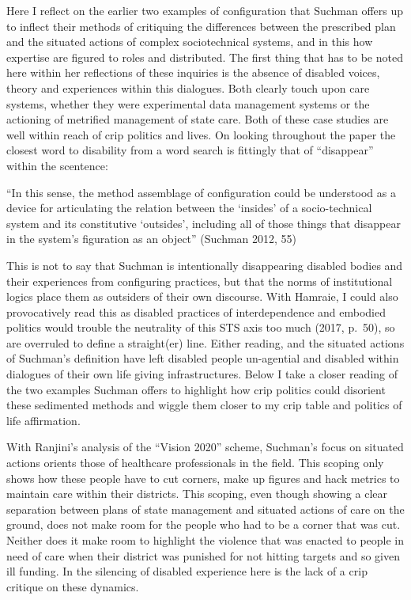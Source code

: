 Here I reflect on the earlier two examples of configuration that Suchman
offers up to inflect their methods of critiquing the differences between
the prescribed plan and the situated actions of complex sociotechnical
systems, and in this how expertise are figured to roles and distributed.
The first thing that has to be noted here within her reflections of
these inquiries is the absence of disabled voices, theory and
experiences within this dialogues. Both clearly touch upon care systems,
whether they were experimental data management systems or the actioning
of metrified management of state care. Both of these case studies are
well within reach of crip politics and lives. On looking throughout the
paper the closest word to disability from a word search is fittingly
that of ``disappear'' within the scentence:

``In this sense, the method assemblage of configuration could be
understood as a device for articulating the relation between the
`insides' of a socio-technical system and its constitutive `outsides',
including all of those things that disappear in the system's figuration
as an object'' (Suchman 2012, 55)

This is not to say that Suchman is intentionally disappearing disabled
bodies and their experiences from configuring practices, but that the
norms of institutional logics place them as outsiders of their own
discourse. With Hamraie, I could also provocatively read this as
disabled practices of interdependence and embodied politics would
trouble the neutrality of this STS axis too much (2017, p.~50), so are
overruled to define a straight(er) line. Either reading, and the
situated actions of Suchman's definition have left disabled people
un-agential and disabled within dialogues of their own life giving
infrastructures. Below I take a closer reading of the two examples
Suchman offers to highlight how crip politics could disorient these
sedimented methods and wiggle them closer to my crip table and politics
of life affirmation.

With Ranjini's analysis of the ``Vision 2020'' scheme, Suchman's focus
on situated actions orients those of healthcare professionals in the
field. This scoping only shows how these people have to cut corners,
make up figures and hack metrics to maintain care within their
districts. This scoping, even though showing a clear separation between
plans of state management and situated actions of care on the ground,
does not make room for the people who had to be a corner that was cut.
Neither does it make room to highlight the violence that was enacted to
people in need of care when their district was punished for not hitting
targets and so given ill funding. In the silencing of disabled
experience here is the lack of a crip critique on these dynamics.

